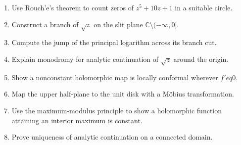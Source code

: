 \begin{enumerate}[label=\textbf{\arabic*.},leftmargin=*]
\item Use Rouch'e's theorem to count zeros of $z^5+10z+1$ in a suitable circle.
\item Construct a branch of $\sqrt z$ on the slit plane $\mathbb C\setminus(-\infty,0]$.
\item Compute the jump of the principal logarithm across its branch cut.
\item Explain monodromy for analytic continuation of $\sqrt z$ around the origin.
\item Show a nonconstant holomorphic map is locally conformal wherever $f'
eq0$.
\item Map the upper half-plane to the unit disk with a Möbius transformation.
\item Use the maximum-modulus principle to show a holomorphic function attaining an interior maximum is constant.
\item Prove uniqueness of analytic continuation on a connected domain.
\end{enumerate}

